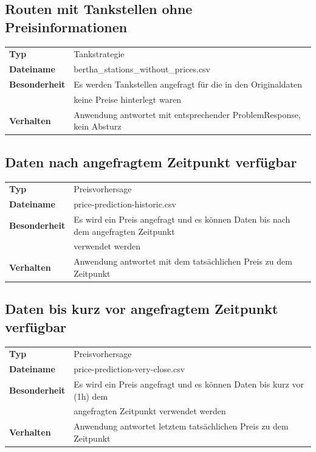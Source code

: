 \documentclass[
ngerman          %
,a4paper          %
,11pt
,pdftex
]{report}
\begin{document}
\subsection{Routen mit Tankstellen ohne Preisinformationen}

\begin{table}[H]
	\centering
	\begin{tabular}{l l}
    	\hline
		\textbf{Typ} & Tankstrategie \\ 
		\textbf{Dateiname} & bertha\_stations\_without\_prices.csv \\
        \textbf{Besonderheit} & Es werden Tankstellen angefragt für die in den Originaldaten \\ 
        & keine Preise hinterlegt waren \\
        \textbf{Verhalten} & Anwendung antwortet mit entsprechender ProblemResponse, kein Absturz \\
		\hline 
	\end{tabular}
\end{table} 

\subsection{Daten nach angefragtem Zeitpunkt verfügbar}

\begin{table}[H]
	\centering
	\begin{tabular}{l l}
    	\hline
		\textbf{Typ} & Preisvorhersage \\ 
		\textbf{Dateiname} & price-prediction-historic.csv \\
        \textbf{Besonderheit} & Es wird ein Preis angefragt und es können Daten bis nach dem angefragten Zeitpunkt \\
        & verwendet werden \\
        \textbf{Verhalten} & Anwendung antwortet mit dem tatsächlichen Preis zu dem Zeitpunkt \\
		\hline 
	\end{tabular}
\end{table} 


\subsection{Daten bis kurz vor angefragtem Zeitpunkt verfügbar}

\begin{table}[H]
	\centering
	\begin{tabular}{l l}
    	\hline
		\textbf{Typ} & Preisvorhersage \\ 
		\textbf{Dateiname} & price-prediction-very-close.csv \\
        \textbf{Besonderheit} & Es wird ein Preis angefragt und es können Daten bis kurz vor (1h) dem \\
        & angefragten Zeitpunkt verwendet werden \\
        \textbf{Verhalten} & Anwendung antwortet letztem tatsächlichen Preis zu dem Zeitpunkt \\
		\hline 
	\end{tabular}
\end{table} 
\end{document}
